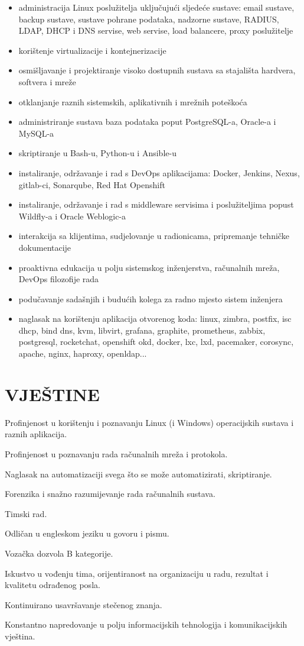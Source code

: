 \documentclass{cv}
\begin{document}
\begin{itemize}
    \setlength\itemsep{0.1cm}
    \item administracija Linux poslužitelja uključujući sljedeće sustave: email sustave, backup sustave, sustave pohrane podataka, nadzorne sustave, RADIUS, LDAP, DHCP i DNS servise, web servise, load balancere, proxy poslužitelje
    \item korištenje virtualizacije i kontejnerizacije
    \item osmišljavanje i projektiranje visoko dostupnih sustava sa stajališta hardvera, softvera i mreže
    \item otklanjanje raznih sistemskih, aplikativnih i mrežnih poteškoća
    \item administriranje sustava baza podataka poput PostgreSQL-a, Oracle-a i MySQL-a
    \item skriptiranje u Bash-u, Python-u i Ansible-u 
    \item instaliranje, održavanje i rad s DevOps aplikacijama: Docker, Jenkins, Nexus, gitlab-ci, Sonarqube, Red Hat Openshift
    \item instaliranje, održavanje i rad s middleware servisima i poslužiteljima popust Wildfly-a i Oracle Weblogic-a
    \item interakcija sa klijentima, sudjelovanje u radionicama, pripremanje tehničke dokumentacije
    \item proaktivna edukacija u polju sistemskog inženjerstva, računalnih mreža, DevOps filozofije rada
    \item podučavanje sadašnjih i budućih kolega za radno mjesto sistem inženjera
    \item naglasak na korištenju aplikacija otvorenog koda: linux, zimbra, postfix, isc dhcp, bind dns, kvm, libvirt, grafana, graphite, prometheus, zabbix, postgresql, rocketchat, openshift okd, docker, lxc, lxd, pacemaker, corosync, apache, nginx, haproxy, openldap...
\end{itemize}
\section{VJEŠTINE}
Profinjenost u korištenju i poznavanju Linux (i Windows) operacijskih sustava i raznih aplikacija.

Profinjenost u poznavanju rada računalnih mreža i protokola.

Naglasak na automatizaciji svega što se može automatizirati, skriptiranje.

Forenzika i snažno razumijevanje rada računalnih sustava.

Timski rad.

Odličan u engleskom jeziku u govoru i pismu.

Vozačka dozvola B kategorije.

Iskustvo u vođenju tima, orijentiranost na organizaciju u radu, rezultat i kvalitetu odrađenog posla.

Kontinuirano usavršavanje stečenog znanja.

Konstantno napredovanje u polju informacijskih tehnologija i komunikacijskih vještina.
\end{document}
